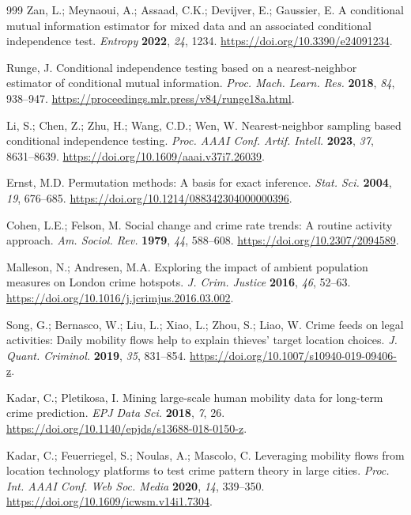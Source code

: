 \begin{thebibliography}{999}
Zan, L.; Meynaoui, A.; Assaad, C.K.; Devijver, E.; Gaussier, E. A conditional mutual information estimator for mixed data and an associated conditional independence test. \emph{Entropy} \textbf{2022}, \emph{24}, 1234. \url{https://doi.org/10.3390/e24091234}.

Runge, J. Conditional independence testing based on a nearest-neighbor estimator of conditional mutual information. \emph{Proc. Mach. Learn. Res.} \textbf{2018}, \emph{84}, 938--947. \url{https://proceedings.mlr.press/v84/runge18a.html}.

Li, S.; Chen, Z.; Zhu, H.; Wang, C.D.; Wen, W. Nearest-neighbor sampling based conditional independence testing. \emph{Proc. AAAI Conf. Artif. Intell.} \textbf{2023}, \emph{37}, 8631--8639. \url{https://doi.org/10.1609/aaai.v37i7.26039}.

Ernst, M.D. Permutation methods: A basis for exact inference. \emph{Stat. Sci.} \textbf{2004}, \emph{19}, 676--685. \url{https://doi.org/10.1214/088342304000000396}.

Cohen, L.E.; Felson, M. Social change and crime rate trends: A routine activity approach. \emph{Am. Sociol. Rev.} \textbf{1979}, \emph{44}, 588--608. \url{https://doi.org/10.2307/2094589}.

Malleson, N.; Andresen, M.A. Exploring the impact of ambient population measures on London crime hotspots. \emph{J. Crim. Justice} \textbf{2016}, \emph{46}, 52--63. \url{https://doi.org/10.1016/j.jcrimjus.2016.03.002}.

Song, G.; Bernasco, W.; Liu, L.; Xiao, L.; Zhou, S.; Liao, W. Crime feeds on legal activities: Daily mobility flows help to explain thieves' target location choices. \emph{J. Quant. Criminol.} \textbf{2019}, \emph{35}, 831--854. \url{https://doi.org/10.1007/s10940-019-09406-z}.

Kadar, C.; Pletikosa, I. Mining large-scale human mobility data for long-term crime prediction. \emph{EPJ Data Sci.} \textbf{2018}, \emph{7}, 26. \url{https://doi.org/10.1140/epjds/s13688-018-0150-z}.

Kadar, C.; Feuerriegel, S.; Noulas, A.; Mascolo, C. Leveraging mobility flows from location technology platforms to test crime pattern theory in large cities. \emph{Proc. Int. AAAI Conf. Web Soc. Media} \textbf{2020}, \emph{14}, 339--350. \url{https://doi.org/10.1609/icwsm.v14i1.7304}.


\end{thebibliography}
